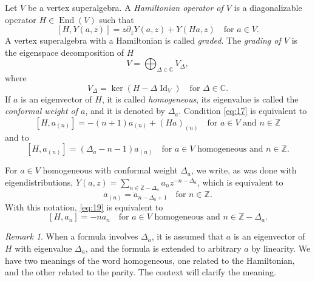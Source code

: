 \documentclass[a4paper, 12pt, reqno]{amsart}
\theoremstyle{remark}
\newtheorem{remark}[theorem]{Remark}
\DeclareMathOperator{\Id}{Id}
\DeclareMathOperator{\End}{End}
\begin{document}
Let $V$ be a vertex superalgebra.
A \emph{Hamiltonian operator of $V$} is a diagonalizable operator $H \in \End(V)$ such that
\begin{equation}
  \label{eq:17}
  [H, Y(a, z)] = z\partial_zY(a, z) + Y(Ha, z) \quad \text{for $a \in V$}.
\end{equation}
A vertex superalgebra with a Hamiltonian is called \emph{graded}.
The \emph{grading of $V$} is the eigenspace decomposition of $H$
\begin{equation*}
  V = \bigoplus_{\Delta \in \mathbb{C}}V_{\Delta},
\end{equation*}
where
\begin{equation*}
  V_{\Delta} = \ker(H - \Delta\Id_V) \quad \text{for $\Delta \in \mathbb{C}$}.
\end{equation*}
If $a$ is an eigenvector of $H$, it is called \emph{homogeneous}, its eigenvalue is called the \emph{conformal weight of $a$}, and it is denoted by $\Delta_a$.
Condition \eqref{eq:17} is equivalent to
\begin{equation}
  \label{eq:18}
  [H, a_{(n)}] = -(n + 1)a_{(n)} + (Ha)_{(n)} \quad \text{for $a \in V$ and $n \in \mathbb{Z}$}
\end{equation}
and to
\begin{equation}
  \label{eq:19}
  [H, a_{(n)}] = (\Delta_a - n - 1)a_{(n)} \quad \text{for $a \in V$ homogeneous and $n \in \mathbb{Z}$}.
\end{equation}

For $a \in V$ homogeneous with conformal weight $\Delta_a$, we write, as was done with eigendistributions, $Y(a, z) = \sum_{n \in \mathbb{Z} - \Delta_a}a_nz^{-n - \Delta_a}$, which is equivalent to
\begin{equation}
  \label{eq:20}
  a_{(n)} = a_{n - \Delta_a + 1} \quad \text{for $n \in \mathbb{Z}$}.
\end{equation}
With this notation, \eqref{eq:19} is equivalent to
\begin{equation}
  \label{eq:21}
  [H, a_n] = -na_n \quad \text{for $a \in V$ homogeneous and $n \in \mathbb{Z} - \Delta_a$}.
\end{equation}

\begin{remark}
  \label{rmk:17}
  When a formula involves $\Delta_a$, it is assumed that $a$ is an eigenvector of $H$ with eigenvalue $\Delta_a$, and the formula is extended to arbitrary $a$ by linearity.
  We have two meanings of the word homogeneous, one related to the Hamiltonian, and the other related to the parity.
  The context will clarify the meaning.
\end{remark}
\end{document}
